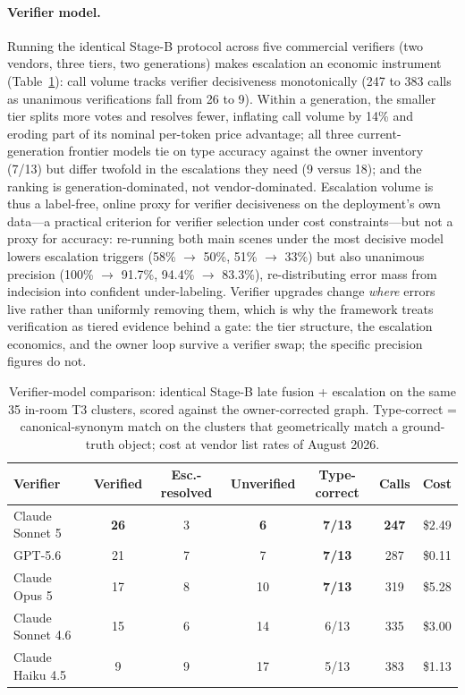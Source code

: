 \paragraph{Verifier model.}
Running the identical Stage-B protocol across five commercial verifiers (two
vendors, three tiers, two generations) makes escalation an economic instrument
(Table~\ref{tab:vlmcmp}): call volume tracks verifier decisiveness
monotonically (247 to 383 calls as unanimous verifications fall from 26 to 9).
Within a generation, the smaller tier splits more votes and resolves fewer,
inflating call volume by 14\% and eroding part of its nominal per-token
price advantage; all three current-generation frontier models tie on type
accuracy against the owner inventory (7/13) but differ twofold in the escalations
they need (9 versus 18); and the ranking is generation-dominated, not vendor-dominated.
Escalation volume is thus a label-free, online proxy for verifier decisiveness
on the deployment's own data---a practical criterion for verifier selection
under cost constraints---but not a proxy for accuracy: re-running both main
scenes under the most decisive model lowers escalation triggers (58\%
$\rightarrow$ 50\%, 51\% $\rightarrow$ 33\%) but also unanimous precision
(100\% $\rightarrow$ 91.7\%, 94.4\% $\rightarrow$ 83.3\%), re-distributing error
mass from indecision into confident under-labeling. Verifier upgrades change
\emph{where} errors live rather than uniformly removing them, which is why the
framework treats verification as tiered evidence behind a gate: the tier
structure, the escalation economics, and the owner loop survive a verifier
swap; the specific precision figures do not.

\begin{table}[htbp]
\centering
\caption{Verifier-model comparison: identical Stage-B late fusion +
escalation on the same 35 in-room T3 clusters, scored against the
owner-corrected graph. Type-correct = canonical-synonym match on the clusters
that geometrically match a ground-truth object; cost at vendor list rates of
August 2026.}
\label{tab:vlmcmp}
\footnotesize{}
\begin{tabular}{l c c c c c c}
\toprule
\textbf{Verifier} & Verified & Esc.-resolved & Unverified & Type-correct & Calls & Cost \\
\midrule
Claude Sonnet 5 & \textbf{26} & 3 & \textbf{6} & \textbf{7/13} & \textbf{247} & \$2.49 \\
GPT-5.6 & 21 & 7 & 7 & \textbf{7/13} & 287 & \$0.11 \\
Claude Opus 5 & 17 & 8 & 10 & \textbf{7/13} & 319 & \$5.28 \\
Claude Sonnet 4.6 & 15 & 6 & 14 & 6/13 & 335 & \$3.00 \\
Claude Haiku 4.5 & 9 & 9 & 17 & 5/13 & 383 & \$1.13 \\
\bottomrule
\end{tabular}
\end{table}


